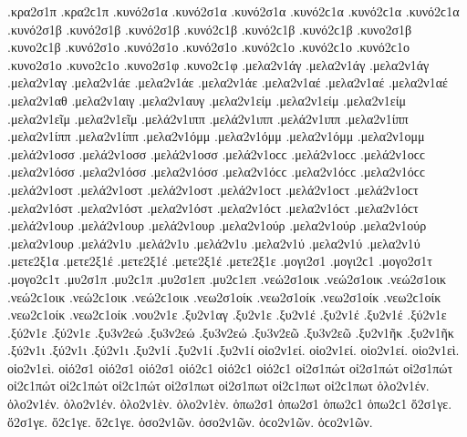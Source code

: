 {.κρα2σ1π .κρα2ϲ1π 
.κυνό2σ1α .κυνό2σ1α .κυνό2σ1α .κυνό2ϲ1α .κυνό2ϲ1α .κυνό2ϲ1α   %
.κυνό2σ1β .κυνό2σ1β .κυνό2σ1β .κυνό2ϲ1β .κυνό2ϲ1β .κυνό2ϲ1β   %
.κυνο2σ1β .κυνο2ϲ1β 
.κυνό2σ1ο .κυνό2σ1ο .κυνό2σ1ο .κυνό2ϲ1ο .κυνό2ϲ1ο .κυνό2ϲ1ο   %
.κυνο2σ1ο .κυνο2ϲ1ο 
.κυνο2σ1φ .κυνο2ϲ1φ   %
.μελα2ν1άγ .μελα2ν1άγ .μελα2ν1άγ   %
.μελα2ν1αγ 
.μελα2ν1άε .μελα2ν1άε .μελα2ν1άε   %
.μελα2ν1αέ .μελα2ν1αέ .μελα2ν1αέ 
.μελα2ν1αθ   %
.μελα2ν1αιγ   %
.μελα2ν1αυγ   %
.μελα2ν1είμ .μελα2ν1είμ .μελα2ν1είμ   %
.μελα2ν1εῖμ .μελα2ν1εῖμ   %
.μελά2ν1ιππ .μελά2ν1ιππ .μελά2ν1ιππ   %
.μελα2ν1ίππ .μελα2ν1ίππ .μελα2ν1ίππ 
.μελα2ν1όμμ .μελα2ν1όμμ .μελα2ν1όμμ   %
.μελα2ν1ομμ 
.μελά2ν1οσσ .μελά2ν1οσσ .μελά2ν1οσσ .μελά2ν1οϲϲ .μελά2ν1οϲϲ .μελά2ν1οϲϲ   %
.μελα2ν1όσσ .μελα2ν1όσσ .μελα2ν1όσσ .μελα2ν1όϲϲ .μελα2ν1όϲϲ .μελα2ν1όϲϲ 
.μελά2ν1οστ .μελά2ν1οστ .μελά2ν1οστ .μελά2ν1οϲτ .μελά2ν1οϲτ .μελά2ν1οϲτ   %
.μελα2ν1όστ .μελα2ν1όστ .μελα2ν1όστ .μελα2ν1όϲτ .μελα2ν1όϲτ .μελα2ν1όϲτ 
.μελά2ν1ουρ .μελά2ν1ουρ .μελά2ν1ουρ   %
.μελα2ν1ούρ .μελα2ν1ούρ .μελα2ν1ούρ 
.μελα2ν1ουρ   %
.μελά2ν1υ .μελά2ν1υ .μελά2ν1υ   %
.μελα2ν1ύ .μελα2ν1ύ .μελα2ν1ύ 
.μετε2ξ1α   %
.μετε2ξ1έ .μετε2ξ1έ .μετε2ξ1έ   %
.μετε2ξ1ε 
.μογι2σ1 .μογι2ϲ1   %
.μογο2σ1τ .μογο2ϲ1τ   %
.μυ2σ1π .μυ2ϲ1π   %
.μυ2σ1επ .μυ2ϲ1επ   %
.νεώ2σ1οικ .νεώ2σ1οικ .νεώ2σ1οικ .νεώ2ϲ1οικ .νεώ2ϲ1οικ .νεώ2ϲ1οικ   %
.νεω2σ1οίκ .νεω2σ1οίκ .νεω2σ1οίκ .νεω2ϲ1οίκ .νεω2ϲ1οίκ .νεω2ϲ1οίκ 
.νου2ν1ε   %
.ξυ2ν1αγ   %
.ξυ2ν1ε 
.ξυ2ν1έ .ξυ2ν1έ .ξυ2ν1έ 
.ξύ2ν1ε .ξύ2ν1ε .ξύ2ν1ε 
.ξυ3ν2εώ .ξυ3ν2εώ .ξυ3ν2εώ   %
.ξυ3ν2εῶ .ξυ3ν2εῶ 
.ξυ2ν1ῆκ .ξυ2ν1ῆκ   %
.ξύ2ν1ι .ξύ2ν1ι .ξύ2ν1ι   %
.ξυ2ν1ί .ξυ2ν1ί .ξυ2ν1ί   %
οἱο2ν1εί. οἱο2ν1εί. οἱο2ν1εί.   %
οἱο2ν1εὶ. οἱο2ν1εὶ. 
οἱό2σ1 οἱό2σ1 οἱό2σ1 οἱό2ϲ1 οἱό2ϲ1 οἱό2ϲ1   %
οἰ2σ1πώτ οἰ2σ1πώτ οἰ2σ1πώτ οἰ2ϲ1πώτ οἰ2ϲ1πώτ οἰ2ϲ1πώτ   %
οἰ2σ1πωτ οἰ2σ1πωτ οἰ2ϲ1πωτ οἰ2ϲ1πωτ 
ὁλο2ν1έν. ὁλο2ν1έν. ὁλο2ν1έν. 
ὁλο2ν1ὲν. ὁλο2ν1ὲν. 
ὁπω2σ1 ὁπω2σ1 ὁπω2ϲ1 ὁπω2ϲ1   %
ὅ2σ1γε. ὅ2σ1γε. ὅ2ϲ1γε. ὅ2ϲ1γε.   %
ὁσο2ν1ῶν. ὁσο2ν1ῶν. ὁϲο2ν1ῶν. ὁϲο2ν1ῶν.   %
}
